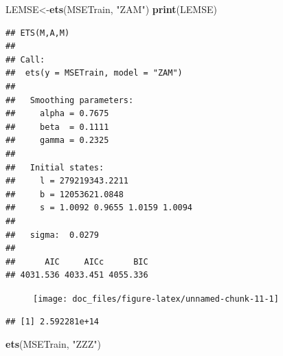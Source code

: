 \documentclass[11pt,]{article}
\newenvironment{Shaded}{\begin{snugshade}}{\end{snugshade}}
\newcommand{\KeywordTok}[1]{\textcolor[rgb]{0.13,0.29,0.53}{\textbf{#1}}}
\newcommand{\DataTypeTok}[1]{\textcolor[rgb]{0.13,0.29,0.53}{#1}}
\newcommand{\DecValTok}[1]{\textcolor[rgb]{0.00,0.00,0.81}{#1}}
\newcommand{\StringTok}[1]{\textcolor[rgb]{0.31,0.60,0.02}{#1}}
\newcommand{\OperatorTok}[1]{\textcolor[rgb]{0.81,0.36,0.00}{\textbf{#1}}}
\newcommand{\NormalTok}[1]{#1}
\begin{document}
\begin{Shaded}
\begin{Highlighting}[]
\NormalTok{LEMSE<-}\KeywordTok{ets}\NormalTok{(MSETrain, }\StringTok{"ZAM"}\NormalTok{)}
\KeywordTok{print}\NormalTok{(LEMSE)}
\end{Highlighting}
\end{Shaded}

\begin{verbatim}
## ETS(M,A,M) 
## 
## Call:
##  ets(y = MSETrain, model = "ZAM") 
## 
##   Smoothing parameters:
##     alpha = 0.7675 
##     beta  = 0.1111 
##     gamma = 0.2325 
## 
##   Initial states:
##     l = 279219343.2211 
##     b = 12053621.0848 
##     s = 1.0092 0.9655 1.0159 1.0094
## 
##   sigma:  0.0279
## 
##      AIC     AICc      BIC 
## 4031.536 4033.451 4055.336
\end{verbatim}

\begin{Shaded}
\end{Shaded}

\begin{figure}

{\centering \texttt{[image: doc\_files/figure-latex/unnamed-chunk-11-1]} 

}

\caption{\label{fig10}}\label{fig:unnamed-chunk-11}
\end{figure}

\begin{Shaded}
\end{Shaded}

\begin{verbatim}
## [1] 2.592281e+14
\end{verbatim}

\begin{Shaded}
\begin{Highlighting}[]
\KeywordTok{ets}\NormalTok{(MSETrain, }\StringTok{"ZZZ"}\NormalTok{)}
\end{Highlighting}
\end{Shaded}
\end{document}
